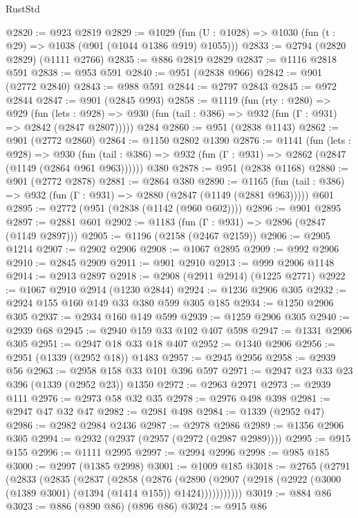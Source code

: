 \begin{lexlean}{RustStd}
\begin{coremodule}
@2820 := @923 @2819
@2829 := @1029 (fun (U : @1028) => @1030 (fun (t : @29) => @1038 (@901 (@1044 @1386 @919) @1055)))
@2833 := @2794 (@2820 @2829) (@1111 @2766)
@2835 := @886 @2819 @2829
@2837 := @1116 @2818 @591
@2838 := @953 @591
@2840 := @951 (@2838 @966)
@2842 := @901 (@2772 @2840)
@2843 := @988 @591
@2844 := @2797 @2843
@2845 := @972 @2844
@2847 := @901 (@2845 @993)
@2858 := @1119
    (fun (rty : @280) =>
    @929
      (fun (lets : @928) =>
      @930 (fun (tail : @386) => @932 (fun (Γ : @931) => @2842 (@2847 @2807)))))
    @284
@2860 := @951 (@2838 @1143)
@2862 := @901 (@2772 @2860)
@2864 := @1150 @2802 @1390
@2876 := @1141
    (fun (lets : @928) =>
    @930 (fun (tail : @386) => @932 (fun (Γ : @931) => @2862 (@2847 (@1149 (@2864 @961 @963))))))
    @380
@2878 := @951 (@2838 @1168)
@2880 := @901 (@2772 @2878)
@2881 := @2864 @380
@2890 := @1165
    (fun (tail : @386) => @932 (fun (Γ : @931) => @2880 (@2847 (@1149 (@2881 @963)))))
    @601
@2895 := @2772 (@951 (@2838 (@1142 (@960 @602))))
@2896 := @901 @2895
@2897 := @2881 @601
@2902 := @1183 (fun (Γ : @931) => @2896 (@2847 (@1149 @2897)))
@2905 := @1196 (@2158 (@2467 @2159))
@2906 := @2905 @1214
@2907 := @2902 @2906
@2908 := @1067 @2895
@2909 := @992 @2906
@2910 := @2845 @2909
@2911 := @901 @2910
@2913 := @999 @2906 @1148
@2914 := @2913 @2897
@2918 := @2908 (@2911 @2914) (@1225 @2771)
@2922 := @1067 @2910 @2914 (@1230 @2844)
@2924 := @1236 @2906 @305
@2932 := @2924 @155 @160 @149 @33 @380 @599 @305 @185
@2934 := @1250 @2906 @305
@2937 := @2934 @160 @149 @599
@2939 := @1259 @2906 @305
@2940 := @2939 @68
@2945 := @2940 @159 @33 @102 @407 @598
@2947 := @1331 @2906 @305
@2951 := @2947 @18 @33 @18 @407
@2952 := @1340 @2906
@2956 := @2951 (@1339 (@2952 @18)) @1483
@2957 := @2945 @2956
@2958 := @2939 @56
@2963 := @2958 @158 @33 @101 @396 @597
@2971 := @2947 @23 @33 @23 @396 (@1339 (@2952 @23)) @1350
@2972 := @2963 @2971
@2973 := @2939 @111
@2976 := @2973 @58 @32 @35
@2978 := @2976 @498 @398
@2981 := @2947 @47 @32 @47
@2982 := @2981 @498
@2984 := @1339 (@2952 @47)
@2986 := @2982 @2984 @2436
@2987 := @2978 @2986
@2989 := @1356 @2906 @305
@2994 := @2932 (@2937 (@2957 (@2972 (@2987 @2989))))
@2995 := @915 @155
@2996 := @1111 @2995
@2997 := @2994 @2996
@2998 := @985 @185
@3000 := @2997 (@1385 @2998)
@3001 := @1009 @185
@3018 := @2765
    (@2791
      (@2833
        (@2835
          (@2837
            (@2858
              (@2876
                (@2890
                  (@2907 (@2918 (@2922 (@3000 (@1389 @3001) (@1394 (@1414 @155)) @1424)))))))))))
@3019 := @884 @86
@3023 := @886 (@890 @86) (@896 @86)
@3024 := @915 @86

\end{coremodule}
\end{lexlean}
